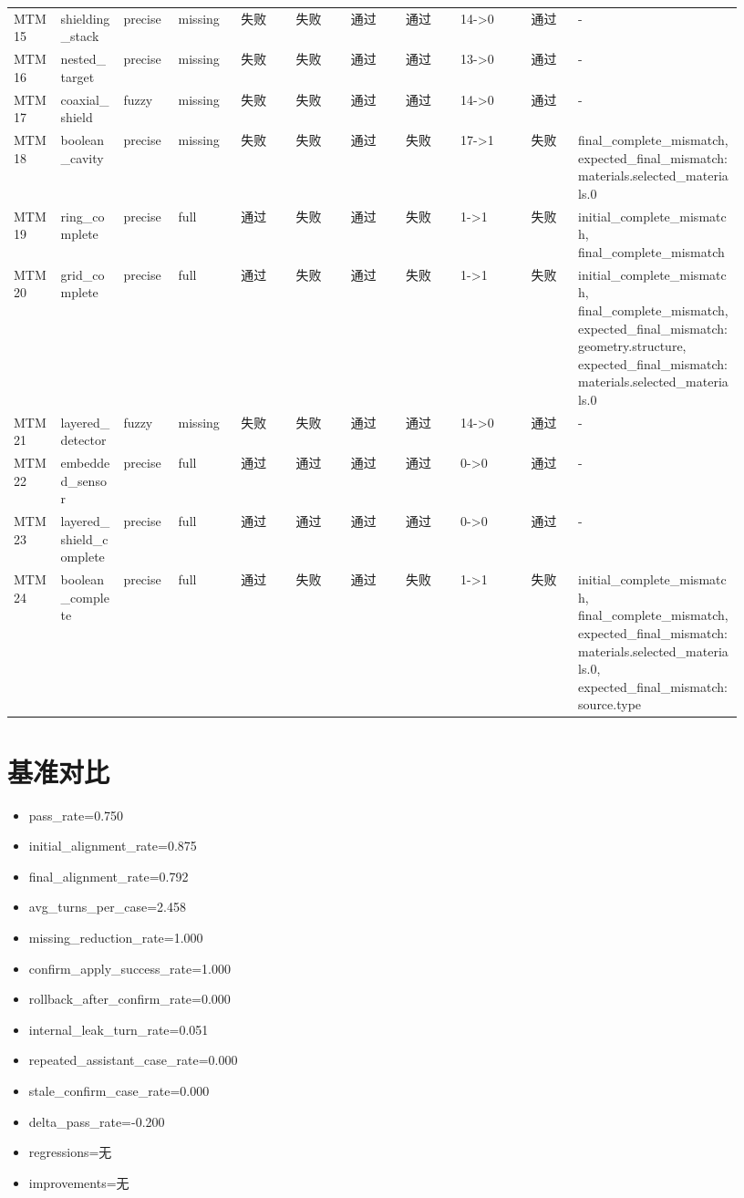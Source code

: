 \documentclass[11pt]{ctexart}
\begin{document}
\begin{longtable}{p{0.06\linewidth}p{0.08\linewidth}p{0.07\linewidth}p{0.08\linewidth}p{0.07\linewidth}p{0.07\linewidth}p{0.07\linewidth}p{0.07\linewidth}p{0.09\linewidth}p{0.06\linewidth}p{0.21\linewidth}}
MTM15 & shielding\_stack & precise & missing & 失败 & 失败 & 通过 & 通过 & 14->0 & 通过 & - \\
MTM16 & nested\_target & precise & missing & 失败 & 失败 & 通过 & 通过 & 13->0 & 通过 & - \\
MTM17 & coaxial\_shield & fuzzy & missing & 失败 & 失败 & 通过 & 通过 & 14->0 & 通过 & - \\
MTM18 & boolean\_cavity & precise & missing & 失败 & 失败 & 通过 & 失败 & 17->1 & 失败 & final\_complete\_mismatch, expected\_final\_mismatch:materials.selected\_materials.0 \\
MTM19 & ring\_complete & precise & full & 通过 & 失败 & 通过 & 失败 & 1->1 & 失败 & initial\_complete\_mismatch, final\_complete\_mismatch \\
MTM20 & grid\_complete & precise & full & 通过 & 失败 & 通过 & 失败 & 1->1 & 失败 & initial\_complete\_mismatch, final\_complete\_mismatch, expected\_final\_mismatch:geometry.structure, expected\_final\_mismatch:materials.selected\_materials.0 \\
MTM21 & layered\_detector & fuzzy & missing & 失败 & 失败 & 通过 & 通过 & 14->0 & 通过 & - \\
MTM22 & embedded\_sensor & precise & full & 通过 & 通过 & 通过 & 通过 & 0->0 & 通过 & - \\
MTM23 & layered\_shield\_complete & precise & full & 通过 & 通过 & 通过 & 通过 & 0->0 & 通过 & - \\
MTM24 & boolean\_complete & precise & full & 通过 & 失败 & 通过 & 失败 & 1->1 & 失败 & initial\_complete\_mismatch, final\_complete\_mismatch, expected\_final\_mismatch:materials.selected\_materials.0, expected\_final\_mismatch:source.type \\
\bottomrule
\end{longtable}
\section{基准对比}
\begin{itemize}
\item pass\_rate=0.750
\item initial\_alignment\_rate=0.875
\item final\_alignment\_rate=0.792
\item avg\_turns\_per\_case=2.458
\item missing\_reduction\_rate=1.000
\item confirm\_apply\_success\_rate=1.000
\item rollback\_after\_confirm\_rate=0.000
\item internal\_leak\_turn\_rate=0.051
\item repeated\_assistant\_case\_rate=0.000
\item stale\_confirm\_case\_rate=0.000
\item delta\_pass\_rate=-0.200
\item regressions=无
\item improvements=无
\end{itemize}
\appendix
\end{document}
